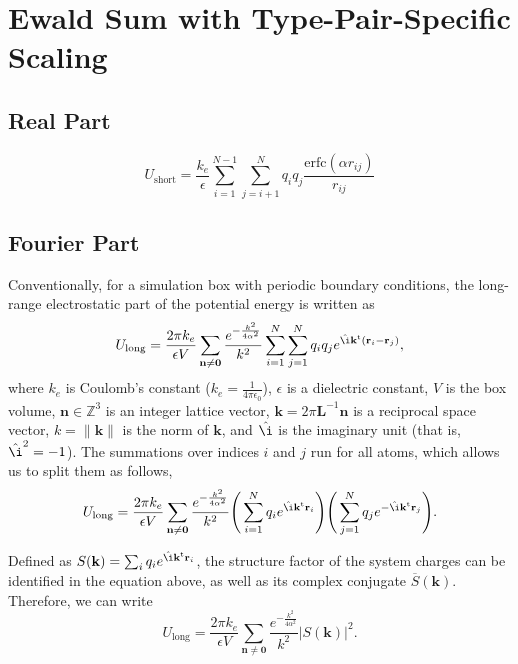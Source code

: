 \documentclass[11pt]{article}
\newcommand{\vt}[1]{\boldsymbol{\mathbf{#1}}}           %
\newcommand{\tr}[1]{#1^\text{t}}                        %
\newcommand{\im}{\hat{\i}}                              %
\begin{document}
\section{Ewald Sum with Type-Pair-Specific Scaling}

\subsection{Real Part}

\begin{equation*}
U_\text{short} = \frac{k_e}{\epsilon} \sum_{i=1}^{N-1} \sum_{j=i+1}^N q_i q_j \frac{\text{erfc}(\alpha r_{ij})}{r_{ij}}
\end{equation*}

\subsection{Fourier Part}

Conventionally, for a simulation box with periodic boundary conditions, the long-range electrostatic part of the potential energy is written as
\begin{equation*}
U_\text{long} = \frac{2\pi k_e}{\epsilon V} \sum_{\vt n \neq \vt 0} \frac{e^{-\frac{k^2}{4\alpha^2}}}{k^2} \sum_{i=1}^N \sum_{j=1}^N q_i q_j e^{\im \tr{\vt k}({\vt r}_i - {\vt r}_j)},
\end{equation*}
where $k_e$ is Coulomb's constant ($k_e = \frac{1}{4\pi\epsilon_0}$), $\epsilon$ is a dielectric constant, $V$ is the box volume, $\vt n \in \mathbb Z^3$ is an integer lattice vector, $\vt k = 2\pi \vt L^{-1}{\vt n}$ is a reciprocal space vector, $k = \|\vt k\|$ is the norm of $\vt k$, and $\im$ is the imaginary unit (that is, $\im^2 = -1$). The summations over indices $i$ and $j$ run for all atoms, which allows us to split them as follows,
\begin{equation*}
U_\text{long} = \frac{2\pi k_e}{\epsilon V}\sum_{\vt n \neq \vt 0} \frac{e^{-\frac{k^2}{4\alpha^2}}}{k^2} \Bigg(\sum_{i=1}^N q_i e^{\im \tr{\vt k}{\vt r}_i} \Bigg) \Bigg(\sum_{j=1}^N q_j e^{-\im \tr{\vt k}{\vt r}_j}\Bigg).
\end{equation*}

Defined as $S(\vt k) = \sum_i q_i e^{\im \tr{\vt k}{\vt r}_i}$, the structure factor of the system charges can be identified in the equation above, as well as its complex conjugate ${\overline S}(\vt k)$. Therefore, we can write
\begin{equation*}
U_\text{long} = \frac{2\pi k_e}{\epsilon V}\sum_{\vt n \neq \vt 0} \frac{e^{-\frac{k^2}{4\alpha^2}}}{k^2} |S(\vt k)|^2.
\end{equation*}
\end{document}
